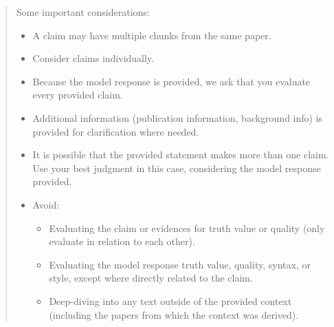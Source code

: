 \documentclass{article}
\begin{document}
\begin{quote}
Some important considerations:
\begin{itemize}
    \item A claim may have multiple chunks from the same paper.
    \item Consider claims individually.
    \item Because the model response is provided, we ask that you evaluate every provided claim.
    \item Additional information (publication information, background info) is provided for clarification where needed.
    \item It is possible that the provided statement makes more than one claim. Use your best judgment in this case, considering the model response provided.
    \item Avoid:
    \begin{itemize}
        \item Evaluating the claim or evidences for truth value or quality (only evaluate in relation to each other).
        \item Evaluating the model response truth value, quality, syntax, or style, except where directly related to the claim.
        \item Deep-diving into any text outside of the provided context (including the papers from which the context was derived).
    \end{itemize}
\end{itemize}
\end{quote}

  

\end{document}
